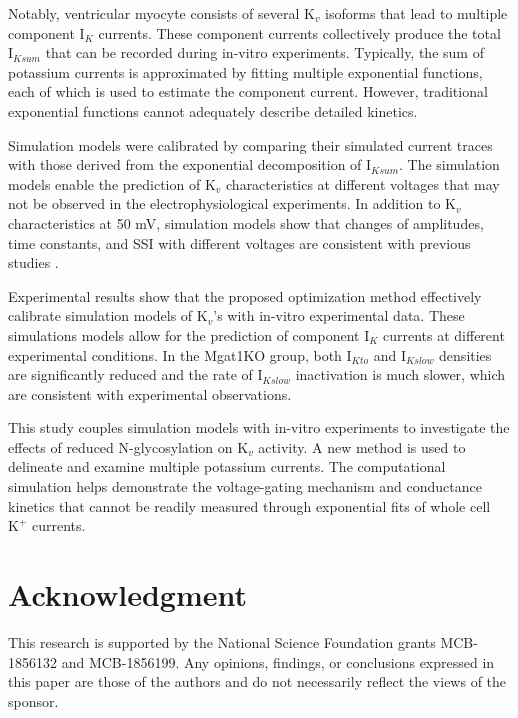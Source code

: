 \documentclass[journal]{IEEEtran}
\begin{document}
Notably, ventricular myocyte consists of several $\text{K}_{v}$ isoforms that lead to multiple component $\text{I}_{K}$ currents. These component currents collectively produce the total $\text{I}_{Ksum}$ that can be recorded during in-vitro experiments. Typically, the sum of potassium currents is approximated by fitting multiple exponential functions, each of which is used to estimate the component current. However, traditional exponential functions cannot adequately describe detailed kinetics.

Simulation models were calibrated by comparing their simulated current traces with those derived from the exponential decomposition of $\text{I}_{Ksum}$. The simulation models enable the prediction of $\text{K}_{v}$ characteristics at different voltages that may not be observed in the electrophysiological experiments. In addition to $\text{K}_{v}$ characteristics at 50 mV, simulation models show that changes of amplitudes, time constants, and SSI with different voltages are consistent with previous studies \cite{ednie2019reduced}.

Experimental results show that the proposed optimization method effectively calibrate simulation models of $\text{K}_{v}$'s with in-vitro experimental data. These simulations models allow for the prediction of component $\text{I}_{K}$ currents at different experimental conditions. In the Mgat1KO group, both $\text{I}_{Kto}$ and $\text{I}_{Kslow}$ densities are significantly reduced and the rate of $\text{I}_{Kslow}$ inactivation is much slower, which are consistent with experimental observations.

This study couples simulation models with in-vitro experiments to investigate the effects of reduced N-glycosylation on $\text{K}_{v}$ activity. A new method is used to delineate and examine multiple potassium currents. The computational simulation helps demonstrate the voltage-gating mechanism and conductance kinetics that cannot be readily measured through exponential fits of whole cell $\text{K}^{+}$ currents. 

\section*{Acknowledgment}
This research is supported by the National Science Foundation grants MCB-1856132 and MCB-1856199. Any opinions, findings, or conclusions expressed in this paper are those of the authors and do not necessarily reflect the views of the sponsor.
\end{document}
